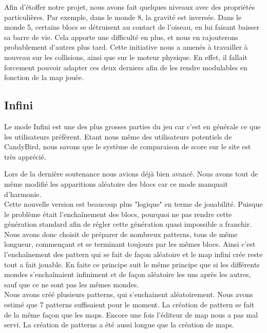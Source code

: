 \documentclass [11pt]{report}
\begin{document}
			\indent Afin d'étoffer notre projet, nous avons fait quelques niveaux avec des propriétés particulières. Par exemple, dans le monde 8, la gravité est inversée. Dans le monde 5, certains blocs se détruisent au contact de l'oiseau, en lui faisant baisser sa barre de vie. Cela apporte une difficulté en plus, et nous en rajouterons probablement d'autres plus tard. Cette initiative nous a amenés à travailler à nouveau sur les collisions, ainsi que sur le moteur physique. En effet, il fallait forcement pouvoir adapter ces deux derniers afin de les rendre modulables en fonction de la map jouée.							
				
			\vspace{10mm}
			
		\subsection{Infini}
			Le mode Infini est une des plus grosses parties du jeu car c'est en générale ce que les utilisateurs préfèrent. Etant nous même des utilisateurs potentiels de CandyBird, nous savons que le système de comparaison de score sur le site est très apprécié.
						
			Lors de la dernière soutenance nous avions déjà bien avancé. Nous avons tout de même modifié les apparitions aléatoire des blocs car ce mode manquait d'harmonie.\\
						
						
			Cette nouvelle version est beaucoup plus "logique" en terme de jouabilité. Puisque le problème était l’enchaînement des blocs, pourquoi ne pas rendre cette génération standard afin de régler cette génération quasi impossible a franchir. Nous avons donc choisit de préparer de nombreux patterns, tous de même longueur, commençant et se terminant toujours par les mêmes blocs. Ainsi c'est l’enchaînement des pattern qui se fait de façon aléatoire et le map infini crée reste tout a fait jouable. En faite ce principe suit le même principe que si les différents mondes s’enchaînaient infiniment et de façon aléatoire les uns après les autres, sauf que ce ne sont pas les mêmes mondes.\\
			
			Nous avons créé plusieurs patterns, qui s'enchainent aléatoirement. Nous avons estimé que 7 patterns suffisaient pour le moment. La création de pattern se fait de la même façon que les maps. Encore une fois l'éditeur de map nous a pas mal servi. La création de patterns a \'et\'e aussi longue que la création de maps.\\
						
\end{document}

